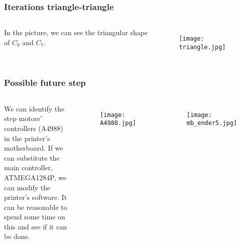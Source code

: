 \documentclass[aspectratio=169]{beamer}\usepackage[utf8]{inputenc}
\begin{document}

\begin{frame}\frametitle{Iterations triangle-triangle}

\begin{columns}[c]

In the picture, we can see the triangular shape of {\color{red}$C_0$} and {\color{blue}$C_7$}.

\begin{figure}[ht!]
\centering
\texttt{[image: triangle.jpg]}
\end{figure}

\end{columns}

\end{frame}


\begin{frame}\frametitle{Possible future step}

\begin{columns}[c]

We can identify the step motors' controllers (A4988) in the printer's motherboard. If we can substitute the main controller, ATMEGA1284P, we can modify the printer's software. It can be reasonable to spend some time on this and see if it can be done.\\
\quad\\
\begin{figure}[ht!]
\centering
\texttt{[image: A4988.jpg]}
\end{figure}

\begin{figure}[ht!]
\centering
\texttt{[image: mb\_ender5.jpg]}
\end{figure}

\end{columns}

\end{frame}

\end{document}
